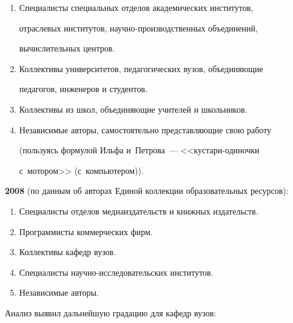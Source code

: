   \begin{enumerate}[1.]

  \item  Специалисты специальных отделов академических институтов,

отраслевых институтов, на\-уч\-но-про\-из\-вод\-ст\-вен\-ных объединений,

вычислительных центров.

\item  Коллективы университетов, педагогических вузов, объединяющие

педагогов, инженеров и студентов.

  \item Коллективы из школ, объединяющие учителей и школьников.

  \item Независимые авторы, самостоятельно представляющие свою работу

(пользуясь формулой Ильфа и~Петрова~--- <<кус\-та\-ри-оди\-ночки

с~мотором>> (с~компьютером)).

  \end{enumerate}



\smallskip



\textbf{2008} (по данным об авторах Единой коллекции образовательных ресурсов):

  \begin{enumerate}[1.]

  \item  Специалисты отделов медиаиздательств и книжных издательств.

  \item Программисты коммерческих фирм.

  \item Коллективы кафедр вузов.



  \pagebreak



  \item Специалисты научно-исследовательских институтов.

  \item Независимые авторы.

  \end{enumerate}



  Анализ выявил дальнейшую градацию для кафедр вузов:

